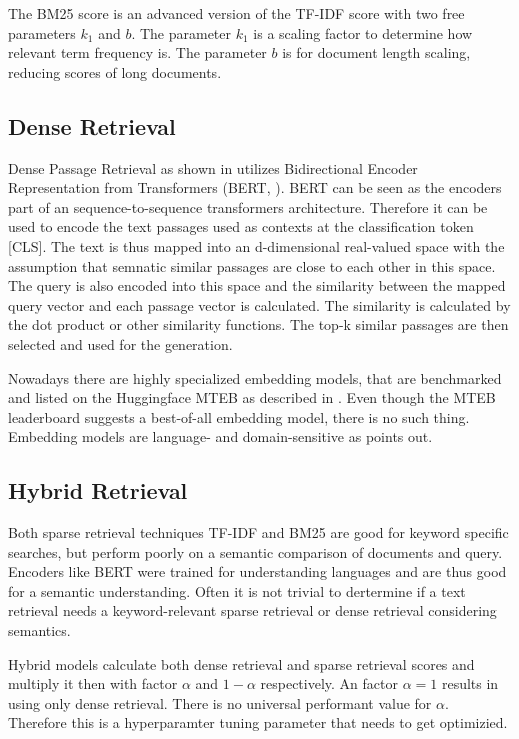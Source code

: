 The BM25 score is an advanced version of the TF-IDF score with two free parameters $k_1$ and $b$. The parameter $k_1$ is a scaling factor to determine how relevant term frequency is. The parameter $b$ is for document length scaling, reducing scores of long documents.

\subsection{Dense Retrieval}
\label{sec:dense_retrieval}

Dense Passage Retrieval as shown in \citet{karpukhin2020densepassageretrievalopendomain} utilizes Bidirectional Encoder Representation from Transformers (BERT, \citet{devlin2019bertpretrainingdeepbidirectional}). BERT can be seen as the encoders part of an sequence-to-sequence transformers architecture. Therefore it can be used to encode the text passages used as contexts at the classification token [CLS]. The text is thus mapped into an d-dimensional real-valued space with the assumption that semnatic similar passages are close to each other in this space. The query is also encoded into this space and the similarity between the mapped query vector and each passage vector is calculated. The similarity is calculated by the dot product or other similarity functions. The top-k similar passages are then selected and used for the generation.

Nowadays there are highly specialized embedding models, that are benchmarked and listed on the Huggingface MTEB as described in \citet{muennighoff2022mteb}. Even though the MTEB leaderboard suggests a best-of-all embedding model, there is no such thing. Embedding models are language- and domain-sensitive as \citet{Gao.18.12.2023} points out. 

\subsection{Hybrid Retrieval}
\label{sec:hybrid_retrieval}

Both sparse retrieval techniques TF-IDF and BM25 are good for keyword specific searches, but perform poorly on a semantic comparison of documents and query. Encoders like BERT were trained for understanding languages and are thus good for a semantic understanding. Often it is not trivial to dertermine if a text retrieval needs a keyword-relevant sparse retrieval or dense retrieval considering semantics. 

Hybrid models calculate both dense retrieval and sparse retrieval scores and multiply it then with factor $\alpha$ and $1-\alpha$ respectively. An factor $\alpha=1$ results in using only dense retrieval. There is no universal performant value for $\alpha$. Therefore this is a hyperparamter tuning parameter that needs to get optimizied.

